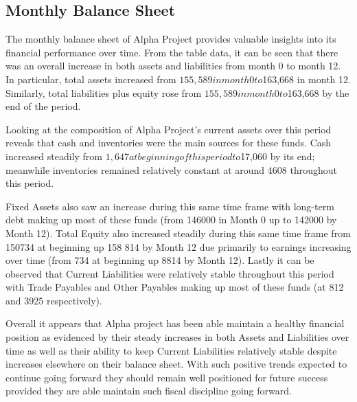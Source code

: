 

\subsection{Monthly Balance Sheet}\label{sec:title}

The monthly balance sheet of Alpha Project provides valuable insights into its financial performance over time. From the table data, it can be seen that there was an overall increase in both assets and liabilities from month 0 to month 12. In particular, total assets increased from $155,589 in month 0 to $163,668 in month 12. Similarly, total liabilities plus equity rose from $155,589 in month 0 to $163,668 by the end of the period. 

Looking at the composition of Alpha Project's current assets over this period reveals that cash and inventories were the main sources for these funds. Cash increased steadily from $1,647 at beginning of this period to $17,060 by its end; meanwhile inventories remained relatively constant at around 4608 throughout this period. 

Fixed Assets also saw an increase during this same time frame with long-term debt making up most of these funds (from 146000 in Month 0 up to 142000 by Month 12). Total Equity also increased steadily during this same time frame from 150734 at beginning up 158 814 by Month 12 due primarily to earnings increasing over time (from 734 at beginning up 8814 by Month 12). Lastly it can be observed that Current Liabilities were relatively stable throughout this period with Trade Payables and Other Payables making up most of these funds (at 812 and 3925 respectively). 

Overall it appears that Alpha project has been able maintain a healthy financial position as evidenced by their steady increases in both Assets and Liabilities over time as well as their ability to keep Current Liabilities relatively stable despite increases elsewhere on their balance sheet. With such positive trends expected to continue going forward they should remain well positioned for future success provided they are able maintain such fiscal discipline going forward.